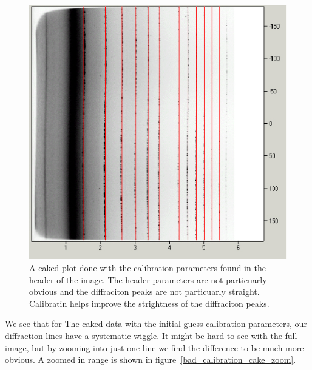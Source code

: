 \begin{figure}
    \centering
    \includegraphics[scale=.75]{figures/bad_calibration_cake.eps}
    \caption{A caked plot done with the calibration parameters
    found in the header of the image. The header parameters
    are not particuarly obvious and the diffraciton peaks
    are not particuarly straight. Calibratin helps improve
    the strightness of the diffraciton peaks.}
    \label{bad_calibration_cake}
\end{figure}

We see that for The caked data with the initial guess 
calibration parameters, our diffraction lines
have a systematic wiggle. It might be hard to see 
with the full image, but by zooming into just one
line we find the difference to be much more obvious.
A zoomed in range is shown in 
figure~\ref{bad_calibration_cake_zoom}.

